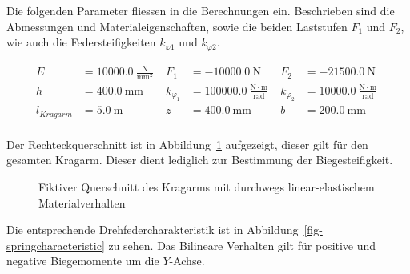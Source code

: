 \documentclass[
  11pt,
  letterpaper,
]{scrreprt}
\begin{document}
Die folgenden Parameter fliessen in die Berechnungen ein. Beschrieben
sind die Abmessungen und Materialeigenschaften, sowie die beiden
Laststufen \(F_1\) und \(F_2\), wie auch die Federsteifigkeiten
\(k_{\varphi1}\) und \(k_{\varphi2}\).

$$
\begin{aligned}
E &= 10000.0\ \frac{\mathrm{N}}{\mathrm{mm}^{2}} \; 
 &F_{1} &= -10000.0\ \mathrm{N} \; 
 &F_{2} &= -21500.0\ \mathrm{N} \; 
\\[12pt]
 h &= 400.0\ \mathrm{mm} \; 
 &k_{\varphi_{1}} &= 100000.0\ \frac{\mathrm{N} \cdot \mathrm{m}}{\mathrm{rad}} \; 
 &k_{\varphi_{2}} &= 10000.0\ \frac{\mathrm{N} \cdot \mathrm{m}}{\mathrm{rad}} \; 
\\[12pt]
 l_{Kragarm} &= 5.0\ \mathrm{m} \; 
 &z &= 400.0\ \mathrm{mm} \; 
 &b &= 200.0\ \mathrm{mm} \; 
\\[12pt]
\end{aligned}
$$

Der Rechteckquerschnitt ist in Abbildung~\ref{fig-qs-kragarm}
aufgezeigt, dieser gilt für den gesamten Kragarm. Dieser dient lediglich
zur Bestimmung der Biegesteifigkeit.

\begin{figure}[H]


\caption{\label{fig-qs-kragarm}Fiktiver Querschnitt des Kragarms mit
durchwegs linear-elastischem Materialverhalten}

\end{figure}%

Die entsprechende Drehfedercharakteristik ist in
Abbildung~\ref{fig-springcharacteristic} zu sehen. Das Bilineare
Verhalten gilt für positive und negative Biegemomente um die
\(Y\)-Achse.
\end{document}
